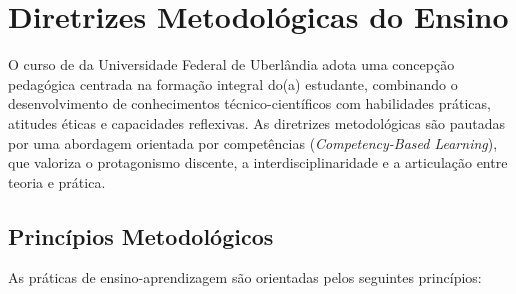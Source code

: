 \chapter{Diretrizes Metodológicas do Ensino}

O curso de \nomecursonovo da Universidade Federal de Uberlândia adota uma concepção pedagógica centrada na formação integral do(a) estudante, combinando o desenvolvimento de conhecimentos técnico-científicos com habilidades práticas, atitudes éticas e capacidades reflexivas. As diretrizes metodológicas são pautadas por uma abordagem orientada por competências (\textit{Competency-Based Learning}), que valoriza o protagonismo discente, a interdisciplinaridade e a articulação entre teoria e prática.

\section{Princípios Metodológicos}

As práticas de ensino-aprendizagem são orientadas pelos seguintes princípios:

